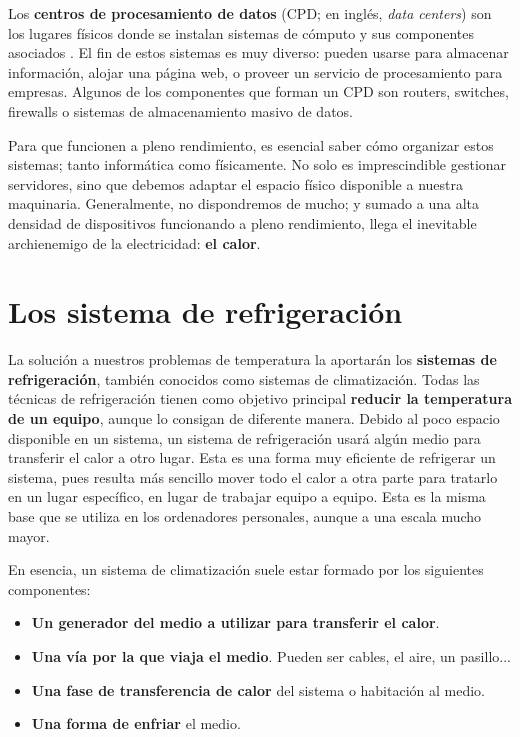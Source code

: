 Los \textbf{centros de procesamiento de datos} (CPD; en inglés, \textit{data centers}) son los lugares físicos donde se instalan sistemas de cómputo y sus componentes asociados \cite{wikipedia-datacenter}. El fin de estos sistemas es muy diverso: pueden usarse para almacenar información, alojar una página web, o proveer un servicio de procesamiento para empresas. Algunos de los componentes que forman un CPD son routers, switches, firewalls o sistemas de almacenamiento masivo de datos.

Para que funcionen a pleno rendimiento, es esencial saber cómo organizar estos sistemas; tanto informática como físicamente. No solo es imprescindible gestionar servidores, sino que debemos adaptar el espacio físico disponible a nuestra maquinaria. Generalmente, no dispondremos de mucho; y sumado a una alta densidad de dispositivos funcionando a pleno rendimiento, llega el inevitable archienemigo de la electricidad: \textbf{el calor}.

\section{Los sistema de refrigeración}

La solución a nuestros problemas de temperatura la aportarán los \textbf{sistemas de refrigeración}, también conocidos como sistemas de climatización. Todas las técnicas de refrigeración tienen como objetivo principal \textbf{reducir la temperatura de un equipo}, aunque lo consigan de diferente manera. Debido al poco espacio disponible en un sistema, un sistema de refrigeración usará algún medio para transferir el calor a otro lugar. Esta es una forma muy eficiente de refrigerar un sistema, pues resulta más sencillo mover todo el calor a otra parte para tratarlo en un lugar específico, en lugar de trabajar equipo a equipo. Esta es la misma base que se utiliza en los ordenadores personales, aunque a una escala mucho mayor.

En esencia, un sistema de climatización suele estar formado por los siguientes componentes:

\begin{itemize}
    \item \textbf{Un generador del medio a utilizar para transferir el calor}.
    \item \textbf{Una vía por la que viaja el medio}. Pueden ser cables, el aire, un pasillo...
    \item \textbf{Una fase de transferencia de calor} del sistema o habitación al medio.
    \item \textbf{Una forma de enfriar} el medio.
\end{itemize}

